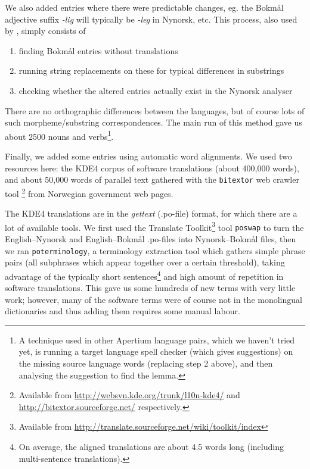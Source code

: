 \documentclass[11pt]{article}
\begin{document}
We also added entries where there were predictable changes, eg. the
Bokmål adjective suffix \emph{-lig} will typically be \emph{-leg} in Nynorsk,
etc. This process, also used by \citet[p.~4]{tyers2009dpm},
simply consists of
\begin{enumerate}
\item finding Bokmål entries without translations \item running string replacements on these for typical differences in
   substrings
\item checking whether the altered entries actually exist in the Nynorsk
   analyser
\end{enumerate}
There are no orthographic differences between the languages, but of
course lots of such morpheme/substring correspondences. The main run
of this method gave us about 2500 nouns and verbs\footnote{A technique
  used in other Apertium language pairs, which we haven't tried yet,
  is running a target language spell checker (which gives suggestions)
  on the missing source language words (replacing step 2 above), and
  then analysing the suggestion to find the lemma. }.

Finally, we added some entries using automatic word alignments. We
used two resources here: the KDE4 corpus of software translations
(about 400,000 words), and about 50,000 words of parallel text
gathered with the {\tt bitextor} web crawler tool
\citep{espla-gomis2009bfs}\footnote{Available
  from
  \href{http://websvn.kde.org/trunk/l10n-kde4/}{http://websvn.kde.org/trunk/l10n-kde4/}
  and
  \href{http://bitextor.sourceforge.net/}{http://bitextor.sourceforge.net/}
  respectively.} from Norwegian government web pages.

The KDE4 translations are in the \emph{gettext} (.po-file) format, for
which there are a lot of available tools. We first used the Translate
Toolkit\footnote{Available from
  \href{http://translate.sourceforge.net/wiki/toolkit/index}{http://translate.sourceforge.net/wiki/toolkit/index}
} tool {\tt poswap} to turn the English–Nynorsk and English–Bokmål
.po-files into Nynorsk–Bokmål files, then we ran
{\tt poterminology}, a terminology extraction tool which gathers
simple phrase pairs (all subphrases which appear together over a
certain threshold), taking advantage of the typically short
sentences\footnote{On average, the aligned translations are about 4.5
  words long (including multi-sentence translations).} and high amount
of repetition in software translations. This gave us some hundreds of
new terms with very little work; however, many of the software terms
were of course not in the monolingual dictionaries and thus adding
them requires some manual labour.
\end{document}
